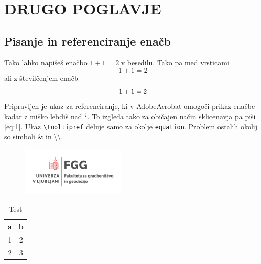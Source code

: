\section{DRUGO POGLAVJE}
\subsection{Pisanje in referenciranje enačb}
Tako lahko napišeš enačbo $1+1=2$ v besedilu. Tako pa med vrsticami
$$1+1=2$$
ali z številčenjem enačb
\begin{equation}\repeatable{eq:1}
  {1+1=2}
\end{equation}
Pripravljen je ukaz za referenciranje, ki v AdobeAcrobat omogoči prikaz enačbe kadar z miško lebdiš nad $^?$.
To izgleda tako  za običajen način sklicenavja pa piši \eqref{eq:1}.
Ukaz \verb|\tooltipref| deluje samo za okolje \verb|equation|. Problem ostalih okolij so simboli \& in \textbackslash\textbackslash .


\begin{figure}[h!]
  \centering
  \includegraphics[width = 5cm]{Img/UL_FGG-logoVER-CMYK_barv.pdf}
\end{figure}


\begin{table}[h!]
  \centering
  \begin{tabular}{c | c}
    a & b\\ 
    \hline
    1 & 2\\
    2 & 3
  \end{tabular}
  \caption{Test}
\end{table}
